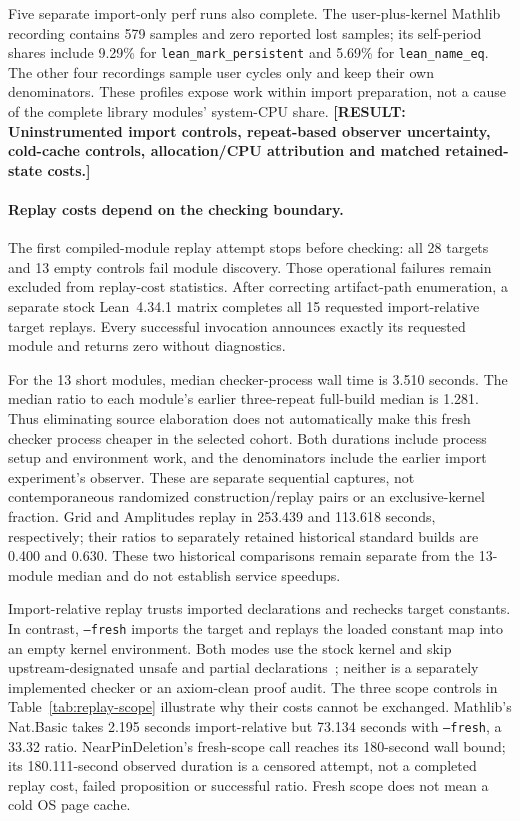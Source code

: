 \documentclass[10pt,twocolumn]{article}
\newcommand{\missing}[1]{\textbf{[RESULT: #1]}}
\begin{document}
Five separate import-only perf runs also complete.
The user-plus-kernel Mathlib recording contains 579 samples and zero
reported lost samples; its self-period shares include 9.29\% for
\texttt{lean\_mark\_persistent} and 5.69\% for \texttt{lean\_name\_eq}.
The other four recordings sample user cycles only and keep their own
denominators. These profiles expose work within import preparation,
not a cause of the complete library modules' system-CPU share.
\missing{Uninstrumented import controls, repeat-based observer uncertainty,
cold-cache controls, allocation/CPU attribution and matched retained-state costs.}

\paragraph{Replay costs depend on the checking boundary.}
The first compiled-module replay attempt stops before checking:
all 28 targets and 13 empty controls fail module discovery.
Those operational failures remain excluded from replay-cost statistics.
After correcting artifact-path enumeration, a separate stock Lean~4.34.1
matrix completes all 15 requested import-relative target replays.
Every successful invocation announces exactly its requested module and
returns zero without diagnostics.

For the 13 short modules, median checker-process wall time is 3.510 seconds.
The median ratio to each module's earlier three-repeat full-build median
is 1.281. Thus eliminating source elaboration does not automatically
make this fresh checker process cheaper in the selected cohort.
Both durations include process setup and environment work, and the
denominators include the earlier import experiment's observer.
These are separate sequential captures, not contemporaneous randomized
construction/replay pairs or an exclusive-kernel fraction.
Grid and Amplitudes replay in 253.439 and 113.618 seconds, respectively;
their ratios to separately retained historical standard builds are
0.400 and 0.630. These two historical comparisons remain separate from
the 13-module median and do not establish service speedups.

Import-relative replay trusts imported declarations and rechecks target
constants. In contrast, \texttt{--fresh} imports the target and replays
the loaded constant map into an empty kernel environment.
Both modes use the stock kernel and skip upstream-designated unsafe and
partial declarations~\cite{leanCheckerDocs}; neither is a separately
implemented checker or an axiom-clean proof audit.
The three scope controls in Table~\ref{tab:replay-scope} illustrate why
their costs cannot be exchanged.
Mathlib's Nat.Basic takes 2.195 seconds import-relative but 73.134 seconds
with \texttt{--fresh}, a 33.32 ratio.
NearPinDeletion's fresh-scope call reaches its 180-second wall bound;
its 180.111-second observed duration is a censored attempt, not a completed
replay cost, failed proposition or successful ratio.
Fresh scope does not mean a cold OS page cache.
\end{document}
